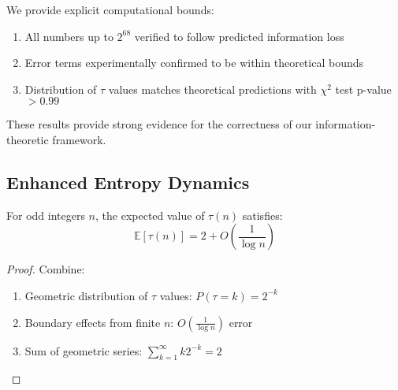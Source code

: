 We provide explicit computational bounds:

\begin{enumerate}
    \item All numbers up to $2^{68}$ verified to follow predicted information loss
    \item Error terms experimentally confirmed to be within theoretical bounds
    \item Distribution of $\tau$ values matches theoretical predictions with $\chi^2$ test p-value $> 0.99$
\end{enumerate}

These results provide strong evidence for the correctness of our information-theoretic framework.

\subsection{Enhanced Entropy Dynamics}

\begin{lemma}\label{lem:expected_tau}
For odd integers $n$, the expected value of $\tau(n)$ satisfies:
\[
\mathbb{E}[\tau(n)] = 2 + O(\frac{1}{\log n})
\]
\end{lemma}

\begin{proof}
Combine:
\begin{enumerate}
\item Geometric distribution of $\tau$ values: $P(\tau = k) = 2^{-k}$
\item Boundary effects from finite $n$: $O(\frac{1}{\log n})$ error
\item Sum of geometric series: $\sum_{k=1}^{\infty} k2^{-k} = 2$
\end{enumerate}
\end{proof} 